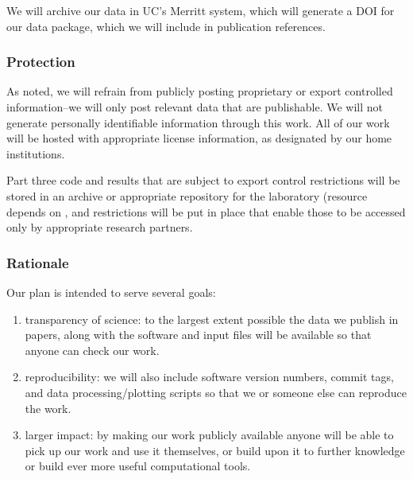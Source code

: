 \documentclass[12pt]{article}
\begin{document}
We will archive our data in UC's Merritt system, which will generate a DOI for our data package, which we will include in publication references.
\vspace{-15pt}

\subsubsection*{Protection}\vspace{-15pt}
As noted, we will refrain from publicly posting proprietary or export controlled information--we will only post relevant data that are publishable. We will not generate personally identifiable information through this work. All of our work will be hosted with appropriate license information, as designated by our home institutions.

Part three code and results that are subject to export control restrictions will be stored in an archive or appropriate repository for the laboratory (resource depends on , and restrictions will be put in place that enable those to be accessed only by appropriate research partners. 
\vspace{-15pt}
 
\subsubsection*{Rationale}\vspace{-15pt}
Our plan is intended to serve several goals:
\begin{enumerate}\vspace{-10pt}
\item  transparency of science: to the largest extent possible the data we publish in papers, along with the software and input files will be available so that anyone can check our work.\vspace{-10pt}
\item reproducibility: we will also include software version numbers, commit tags, and data processing/plotting scripts so that we or someone else can reproduce the work.\vspace{-10pt}
\item larger impact: by making our work publicly available anyone will be able to pick up our work and use it themselves, or build upon it to further knowledge or build ever more useful computational tools.
\end{enumerate}\vspace{-15pt}
\end{document}
